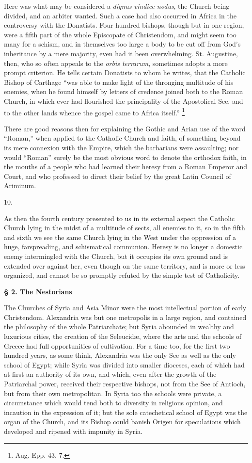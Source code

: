 Here was what may be considered a \emph{dignus vindice nodus}, the
Church being divided, and an arbiter wanted. Such a case had also
occurred in Africa in the controversy with the Donatists. Four hundred
bishops, though but in one region, were a fifth part of the whole
Episcopate of Christendom, and might seem too many for a schism, and
in themselves too large a body to be cut off from God's inheritance by
a mere majority, even had it been overwhelming. St. Augustine, then,
who so often appeals to the \emph{orbis terrarum}, sometimes adopts a
more prompt criterion. He tells certain Donatists to whom he writes,
that the Catholic Bishop of Carthage ``was able to make light
of
the thronging multitude of his enemies, when he found himself by
letters of credence joined both to the Roman Church, in which ever had
flourished the principality of the Apostolical See, and to the other
lands whence the gospel came to Africa itself.'' \footnote{Aug. Epp. 43. 7.}

There are good reasons then for explaining the Gothic and Arian use
of the word ``Roman,'' when applied to the Catholic Church and
faith, of something beyond its mere connexion with the Empire, which
the barbarians were assaulting; nor would ``Roman'' surely be
the most obvious word to denote the orthodox faith, in the mouths of a
people who had learned their heresy from a Roman Emperor and Court,
and who professed to direct their belief by the great Latin Council of
Ariminum.

10.

As then the fourth century presented to us in its external aspect
the Catholic Church lying in the midst of a multitude of sects, all
enemies to it, so in the fifth and sixth we see the same Church lying
in the West under the oppression of a huge, farspreading, and
schismatical communion. Heresy is no longer a domestic enemy
intermingled with the Church, but it occupies its own ground and is
extended over against her, even though on the same territory, and is
more or less organized, and cannot be so promptly refuted by the
simple test of Catholicity.

\textbf{§ 2. The Nestorians}

The Churches of Syria and Asia Minor were the most
intellectual portion of early Christendom. Alexandria was but one
metropolis in a large region, and contained the philosophy of the
whole Patriarchate; but Syria abounded in wealthy and luxurious
cities, the creation of the Seleucidæ, where the arts and the schools
of Greece had full opportunities of cultivation. For a time too, for
the first two hundred years, as some think, Alexandria was the only
See as well as the only school of Egypt; while Syria was divided into
smaller dioceses, each of which had at first an authority of its own,
and which, even after the growth of the Patriarchal power, received
their respective bishops, not from the See of Antioch, but from their
own metropolitan. In Syria too the schools were private, a
circumstance which would tend both to diversity in religious opinion,
and incaution in the expression of it; but the sole catechetical
school of Egypt was the organ of the Church, and its Bishop could
banish Origen for speculations which developed and ripened with
impunity in Syria.

